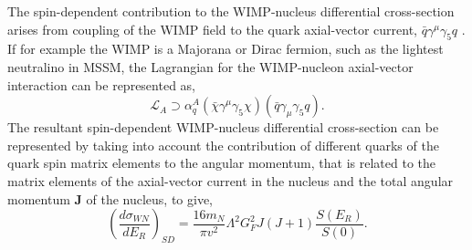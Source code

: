 The spin-dependent contribution to the WIMP-nucleus differential cross-section arises from coupling of the WIMP field to the quark axial-vector current, $\bar{q}\gamma^{\mu}\gamma_{5}q$ \cite{Jungman_1996}. If for example the WIMP is a Majorana or Dirac fermion, such as the lightest neutralino in MSSM, the Lagrangian for the WIMP-nucleon axial-vector interaction can be represented as,
%
\begin{equation} \label{eq:axial_vector_lagrangian}
   \mathcal{L}_{A} \supset \alpha^{A}_{q} (\bar{\chi}\gamma^{\mu}\gamma_{5}\chi) (\bar{q}\gamma_{\mu}\gamma_{5}q). 
\end{equation}
%
The resultant spin-dependent WIMP-nucleus differential cross-section can be represented by taking into account the contribution of different quarks of the quark spin matrix elements to the angular momentum, that is related to the matrix elements of the axial-vector current in the nucleus and the total angular momentum $\boldsymbol{J}$ of the nucleus, to give,
%
\begin{equation} \label{eq:nuclear_matrix_element}
   	\left(\frac{d\sigma_{WN}}{dE_{R}}\right)_{SD} = \frac{16m_{N}}{\pi{}v^{2}}\Lambda^2G^{2}_{F}J(J+1)\frac{S(E_{R})}{S(0)}.
\end{equation}
%
